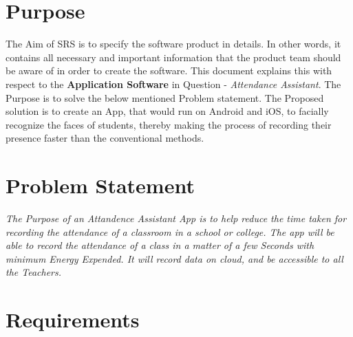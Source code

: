 \documentclass[11pt]{article}
\begin{document}
\tableofcontents
\thispagestyle{empty}
\clearpage

\setcounter{page}{1}

\section{Purpose}
The Aim of SRS is to specify the software product in details. In other words, it contains all necessary and important information that the product team should be aware of in order to create the software. This document explains this with respect to the \textbf{Application Software} in Question - \textit{Attendance Assistant}. The Purpose is to solve the below mentioned Problem statement. The Proposed solution is to create an App, that would run on Android and iOS, to facially recognize the faces of students, thereby making the process of recording their presence faster than the conventional methods.  

\section{Problem Statement}
\textit{The Purpose of an Attandence Assistant App is to help reduce the time taken for recording the attendance of a classroom in a school or college. The app will be able to record the attendance of a class in a matter of a few Seconds with minimum Energy Expended. It will record data on cloud, and be accessible to all the Teachers.}\\

\section{Requirements}
\end{document}
